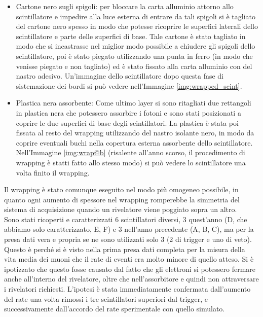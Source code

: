 \begin{itemize}

\item Cartone nero sugli spigoli: per bloccare la carta alluminio attorno allo scintillatore e impedire alla luce esterna di entrare da tali spigoli si è tagliato del cartone
nero spesso in modo che potesse ricoprire le superfici laterali dello scintillatore e parte delle superfici di base. Tale cartone è stato tagliato in modo che si incastrasse
nel miglior modo possibile a chiudere gli spigoli dello scintillatore, poi è stato piegato utilizzando una punta in ferro (in modo che venisse piegato
e non tagliato) ed è stato fissato alla carta alluminio con del nastro adesivo. Un'immagine dello scintillatore dopo questa fase di sistemazione dei bordi si può vedere
nell'Immagine \ref{img:wrapped_scint}.


\item Plastica nera assorbente: Come ultimo layer si sono ritagliati due rettangoli in plastica nera che potessero assorbire i fotoni e sono stati posizionati a coprire
le due superfici di base degli scintillatori. La plastica è stata poi fissata al resto del wrapping utilizzando del nastro isolante nero, in modo da coprire eventuali buchi
nella copertura esterna assorbente dello scintillatore. Nell'Immagine \ref{img:wrap@b} (risalente all'anno scorso, il procedimento di wrapping è statti fatto
allo stesso modo) si può vedere lo scintillatore una volta finito il wrapping.


\end{itemize}
Il wrapping è stato comunque eseguito nel modo più omogeneo possibile, in quanto ogni aumento di spessore nel wrapping romperebbe la simmetria del sistema di acquisizione quando un rivelatore viene poggiato sopra un altro.\\

Sono stati ricoperti e caratterizzati 6 scintillatori diversi, 3 quest'anno (D, che abbiamo solo caratterizzato, E, F) e 3 nell'anno precedente (A, B, C), ma per la presa dati vera e propria se ne sono utilizzati solo 3 (2 di trigger e uno di veto). Questo \`e perch\'e si \`e visto nella prima presa dati completa per la misura della vita media dei muoni che il rate di eventi era molto minore di quello atteso. Si \`e ipotizzato che questo fosse causato dal fatto che gli elettroni si potessero fermare anche all'interno del rivelatore, oltre che nell'assorbitore e quindi non attraversare i  rivelatori richiesti. L'ipotesi \`e stata immediatamente confermata dall'aumento del rate una volta rimossi i tre scintillatori superiori dal trigger, e successivamente dall'accordo del rate sperimentale con quello simulato.

